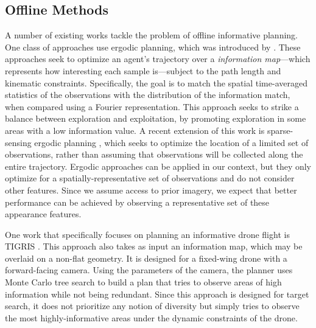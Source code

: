 \subsection{Offline Methods}
%
A number of existing works tackle the problem of offline informative planning. One class of approaches use ergodic planning, which was introduced by \cite{ergodic2011}. These approaches seek to optimize an agent's trajectory over a \textit{information map}---which represents how interesting each sample is---subject to the path length and kinematic constraints. Specifically, the goal is to match the spatial time-averaged statistics of the observations with the distribution of the information match, when compared using a Fourier representation. This approach seeks to strike a balance between exploration and exploitation, by promoting exploration in some areas with a low information value.
A recent extension of this work is sparse-sensing ergodic planning \cite{Rao}, which seeks to optimize the location of 
a limited set of observations, rather than assuming that observations will be collected along the entire trajectory. Ergodic approaches can be applied in our context, but they only optimize for a spatially-representative set of observations and do not consider other features. Since we assume access to prior imagery, we expect that better performance can be achieved by observing a representative set of these appearance features. 

One work that specifically focuses on planning an informative drone flight is TIGRIS \cite{Moon2022TIGRIS:Planning}. This approach also takes as input an information map, which may be overlaid on a non-flat geometry. It is designed for a fixed-wing drone with a forward-facing camera. Using the parameters of the camera, the planner uses Monte Carlo tree search \cite{Browne2012AMethodsEdited} to build a plan that tries to observe areas of high information while not being redundant. Since this approach is designed for target search, it does not prioritize any notion of diversity but simply tries to observe the most highly-informative areas under the dynamic constraints of the drone. 

